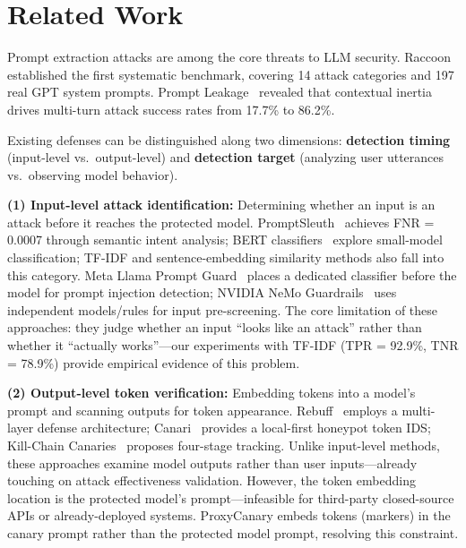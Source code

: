 \documentclass[11pt,a4paper]{article}
\begin{document}
\section{Related Work}

Prompt extraction attacks are among the core threats to LLM security. Raccoon~\cite{wang2024raccoon} established the first systematic benchmark, covering 14 attack categories and 197 real GPT system prompts. Prompt Leakage~\cite{agarwal2024prompt} revealed that contextual inertia drives multi-turn attack success rates from 17.7\% to 86.2\%.

Existing defenses can be distinguished along two dimensions: \textbf{detection timing} (input-level vs.\ output-level) and \textbf{detection target} (analyzing user utterances vs.\ observing model behavior).

\textbf{(1) Input-level attack identification:} Determining whether an input is an attack before it reaches the protected model. PromptSleuth~\cite{wang2025promptsleuth} achieves FNR = 0.0007 through semantic intent analysis; BERT classifiers~\cite{zivanovic2025bert} explore small-model classification; TF-IDF and sentence-embedding similarity methods also fall into this category. Meta Llama Prompt Guard~\cite{meta2024llama} places a dedicated classifier before the model for prompt injection detection; NVIDIA NeMo Guardrails~\cite{nvidia2024nemo} uses independent models/rules for input pre-screening. The core limitation of these approaches: they judge whether an input ``looks like an attack'' rather than whether it ``actually works''---our experiments with TF-IDF (TPR = 92.9\%, TNR = 78.9\%) provide empirical evidence of this problem.

\textbf{(2) Output-level token verification:} Embedding tokens into a model's prompt and scanning outputs for token appearance. Rebuff~\cite{rebuff2025} employs a multi-layer defense architecture; Canari~\cite{canari2025} provides a local-first honeypot token IDS; Kill-Chain Canaries~\cite{wang2024killchain} proposes four-stage tracking. Unlike input-level methods, these approaches examine model outputs rather than user inputs---already touching on attack effectiveness validation. However, the token embedding location is the protected model's prompt---infeasible for third-party closed-source APIs or already-deployed systems. ProxyCanary embeds tokens (markers) in the canary prompt rather than the protected model prompt, resolving this constraint.
\end{document}
